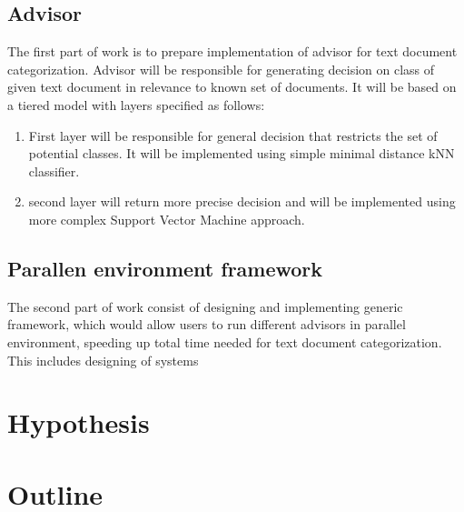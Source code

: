 	\subsection{Advisor}
	The first part of work is to prepare implementation of advisor for text document categorization. Advisor will be responsible for generating decision on class of given text document in relevance to known set of documents. It will be based on a tiered model with layers specified as follows:
	\begin{enumerate}
		\item First layer will be responsible for general decision that restricts the set of potential classes. It will be implemented using simple minimal distance kNN classifier.
		\item second layer will return more precise decision and will be implemented using more complex Support Vector Machine approach.
	\end{enumerate}
	
	\subsection{Parallen environment framework}
	The second part of work consist of designing and implementing generic framework, which would allow users to run different advisors in parallel environment, speeding up total time needed for text document categorization. This includes designing of systems 

\section{Hypothesis}
\label{hypo}

\section{Outline}
\label{outline}

